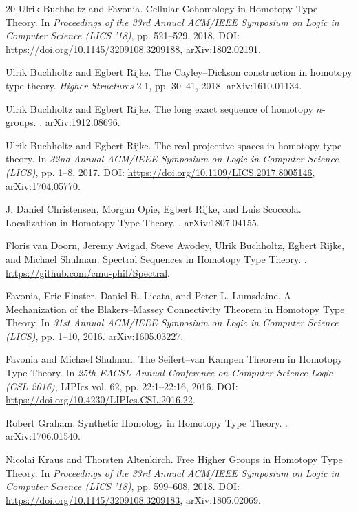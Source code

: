 \documentclass[a4paper,UKenglish,cleveref, autoref, thm-restate]{lipics-v2021}
\begin{document}
\begin{thebibliography}{20}
Ulrik Buchholtz and Favonia.
\newblock Cellular Cohomology in Homotopy Type Theory.
\newblock In \emph{Proceedings of the 33rd Annual ACM/IEEE Symposium on Logic in Computer Science (LICS '18)}, pp. 521--529, 2018.
\newblock DOI: \url{https://doi.org/10.1145/3209108.3209188}, arXiv:1802.02191.

Ulrik Buchholtz and Egbert Rijke.
\newblock The Cayley--Dickson construction in homotopy type theory.
\newblock \emph{Higher Structures} 2.1, pp. 30--41, 2018.
\newblock arXiv:1610.01134.

Ulrik Buchholtz and Egbert Rijke.
\newblock The long exact sequence of homotopy $n$-groups.
. arXiv:1912.08696.

Ulrik Buchholtz and Egbert Rijke.
\newblock The real projective spaces in homotopy type theory.
\newblock In \emph{32nd Annual ACM/IEEE Symposium on Logic in Computer Science (LICS)}, pp. 1--8, 2017.
\newblock DOI: \url{https://doi.org/10.1109/LICS.2017.8005146}, arXiv:1704.05770.

J. Daniel Christensen, Morgan Opie, Egbert Rijke, and Luis Scoccola.
\newblock Localization in Homotopy Type Theory.
. arXiv:1807.04155.

Floris van Doorn, Jeremy Avigad, Steve Awodey, Ulrik Buchholtz, Egbert Rijke, and Michael Shulman.
\newblock Spectral Sequences in Homotopy Type Theory.
. \url{https://github.com/cmu-phil/Spectral}.

Favonia, Eric Finster, Daniel R. Licata, and Peter L. Lumsdaine.
\newblock A Mechanization of the Blakers--Massey Connectivity Theorem in Homotopy Type Theory.
\newblock In \emph{31st Annual ACM/IEEE Symposium on Logic in Computer Science (LICS)}, pp. 1--10, 2016.
\newblock arXiv:1605.03227.

Favonia and Michael Shulman.
\newblock The Seifert--van Kampen Theorem in Homotopy Type Theory.
\newblock In \emph{25th EACSL Annual Conference on Computer Science Logic (CSL 2016)}, LIPIcs vol. 62, pp. 22:1--22:16, 2016.
\newblock DOI: \url{https://doi.org/10.4230/LIPIcs.CSL.2016.22}.

Robert Graham.
\newblock Synthetic Homology in Homotopy Type Theory.
. arXiv:1706.01540.

Nicolai Kraus and Thorsten Altenkirch.
\newblock Free Higher Groups in Homotopy Type Theory.
\newblock In \emph{Proceedings of the 33rd Annual ACM/IEEE Symposium on Logic in Computer Science (LICS '18)}, pp. 599--608, 2018.
\newblock DOI: \url{https://doi.org/10.1145/3209108.3209183}, arXiv:1805.02069.


\end{thebibliography}
\end{document}
